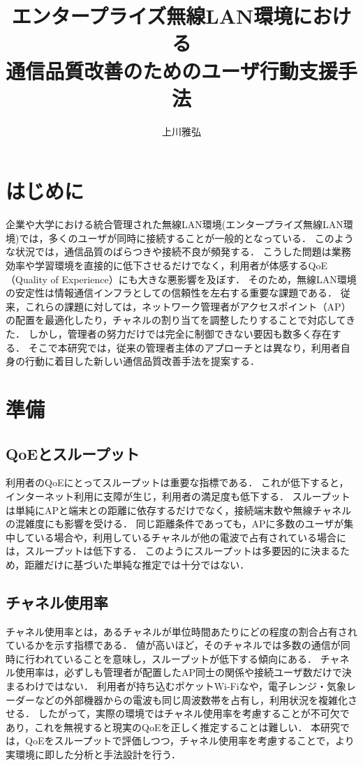 \documentclass[dvipdfmx,twocolumn]{jsarticle}
\title{エンタープライズ無線LAN環境における\\通信品質改善のためのユーザ行動支援手法}
\author{上川雅弘}
\newcommand{\Note}[1]{\noindent \textbf{\textcolor{blue}{#1}}}
\begin{document}
\maketitle

\section{はじめに}
企業や大学における統合管理された無線LAN環境(エンタープライズ無線LAN環境)では，多くのユーザが同時に接続することが一般的となっている．
このような状況では，通信品質のばらつきや接続不良が頻発する．
こうした問題は業務効率や学習環境を直接的に低下させるだけでなく，利用者が体感するQoE（Quality of Experience）にも大きな悪影響を及ぼす．
そのため，無線LAN環境の安定性は情報通信インフラとしての信頼性を左右する重要な課題である．
従来，これらの課題に対しては，ネットワーク管理者がアクセスポイント（AP）の配置を最適化したり，チャネルの割り当てを調整したりすることで対応してきた．
しかし，管理者の努力だけでは完全に制御できない要因も数多く存在する．
そこで本研究では，従来の管理者主体のアプローチとは異なり，利用者自身の行動に着目した新しい通信品質改善手法を提案する．
\section{準備}
\subsection{QoEとスループット}
利用者のQoEにとってスループットは重要な指標である．
これが低下すると，インターネット利用に支障が生じ，利用者の満足度も低下する．
スループットは単純にAPと端末との距離に依存するだけでなく，接続端末数や無線チャネルの混雑度にも影響を受ける．
同じ距離条件であっても，APに多数のユーザが集中している場合や，利用しているチャネルが他の電波で占有されている場合には，スループットは低下する．
このようにスループットは多要因的に決まるため，距離だけに基づいた単純な推定では十分ではない．
\subsection{チャネル使用率}
チャネル使用率とは，あるチャネルが単位時間あたりにどの程度の割合占有されているかを示す指標である．
値が高いほど，そのチャネルでは多数の通信が同時に行われていることを意味し，スループットが低下する傾向にある．
チャネル使用率は，必ずしも管理者が配置したAP同士の関係や接続ユーザ数だけで決まるわけではない．
利用者が持ち込むポケットWi-Fiなや，電子レンジ・気象レーダーなどの外部機器からの電波も同じ周波数帯を占有し，利用状況を複雑化させる．
したがって，実際の環境ではチャネル使用率を考慮することが不可欠であり，これを無視すると現実のQoEを正しく推定することは難しい．
本研究では，QoEをスループットで評価しつつ，チャネル使用率を考慮することで，より実環境に即した分析と手法設計を行う．
\end{document}
